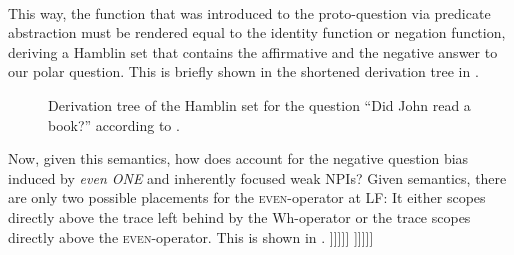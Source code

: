 \ex
{}\\\emptyfill\parencite[p.~331]{Guerzoni2004}
\xe
This way, the function that was introduced to the proto-question via predicate abstraction must be rendered equal to the identity function or negation function, deriving a Hamblin set that contains the affirmative and the negative answer to our polar question. This is briefly shown in the shortened derivation tree in .
\begin{figure}[!htb]
    \centering
    
    \caption{Derivation tree of the Hamblin set for the question \enquote{Did John read a book?} according to \textcite{Guerzoni2003,Guerzoni2004}.}
\end{figure}
Now, given this semantics, how does \textcite{Guerzoni2003,Guerzoni2004} account for the negative question bias induced by \textit{even \MakeUppercase{one}} and inherently focused weak NPIs? Given  semantics, there are only two possible placements for the {\scshape even}-operator at LF: It either scopes directly above the trace left behind by the Wh-operator or the trace scopes directly above the {\scshape even}-operator. This is shown in .
\pex\label{ex:guerzoni-even-lf}
\a[] [ whether-(or-not) [ 1 [ Q [ t\textsubscript{1} [ even\textsubscript{C} [ John read a book ]\hspace{0.5mm}]\hspace{0.5mm}]\hspace{0.5mm}]\hspace{0.5mm}]\hspace{0.5mm}]
\a[] [ whether-(or-not) [ 1 [ Q [ even\textsubscript{C} [ t\textsubscript{1} [ John read a book ]\hspace{0.5mm}]\hspace{0.5mm}]\hspace{0.5mm}]\hspace{0.5mm}]\hspace{0.5mm}]
\xe
